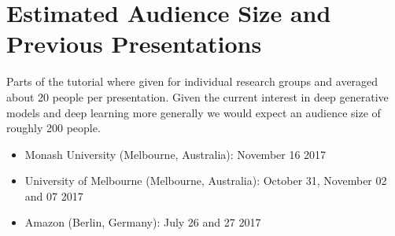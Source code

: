 \section{Estimated Audience Size and Previous Presentations}

Parts of the tutorial where given for individual research groups and averaged about 20 people per presentation. Given the current interest in deep generative models and deep learning more generally we 
would expect an audience size of roughly 200 people.

\begin{itemize}
	\item Monash University (Melbourne, Australia): November 16 2017
	\item University of Melbourne (Melbourne, Australia): October 31, November 02 and 07 2017
	\item Amazon (Berlin, Germany): July 26 and 27 2017
\end{itemize}
